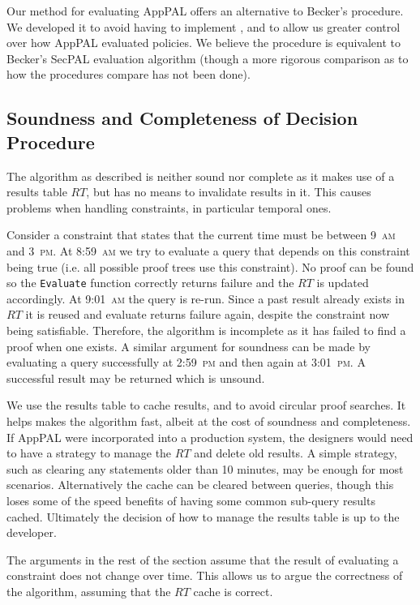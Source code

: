 \documentclass[thesis.tex]{subfiles}
\begin{document}
Our method for evaluating AppPAL offers an alternative to Becker's procedure.
We developed it to avoid having to implement \datalogc{}, and to allow us
greater control over how AppPAL evaluated policies.  We believe the procedure
is equivalent to Becker's SecPAL evaluation algorithm (though a more rigorous
comparison as to how the procedures compare has not been done).

\subsection{Soundness and Completeness of Decision Procedure}

The algorithm as described is neither sound nor complete as it makes
use of a results table $RT$, but has no means to invalidate results in
it. This causes problems when handling constraints, in particular
temporal ones.

Consider a constraint that states that the current time must be between
9~\textsc{am} and 3~\textsc{pm}. At 8:59~\textsc{am} we try to evaluate a query
that depends on this constraint being true (i.e. all possible proof trees use
this constraint). No proof can be found so the \texttt{Evaluate} function
correctly returns failure and the $RT$ is updated accordingly. At
9:01~\textsc{am} the query is re-run. Since a past result already exists in $RT$
it is reused and evaluate returns failure again, despite the constraint now
being satisfiable. Therefore, the algorithm is incomplete as it has failed to
find a proof when one exists. A similar argument for soundness can be made by
evaluating a query successfully at 2:59~\textsc{pm} and then again at
3:01~\textsc{pm}. A successful result may be returned which is unsound.

We use the results table to cache results, and to avoid circular proof searches.
It helps makes the algorithm fast, albeit at the cost of soundness and
completeness. If AppPAL were incorporated into a production system, the
designers would need to have a strategy to manage the $RT$ and delete old
results. A simple strategy, such as clearing any statements older than 10
minutes, may be enough for most scenarios.  Alternatively the cache can be cleared between queries, though this loses some of the speed benefits of having some common sub-query results cached.  Ultimately the decision of how to manage the results table is up to the developer.

The arguments in the rest of the section assume that the result of evaluating a
constraint does not change over time. This allows us to argue the
correctness of the algorithm, assuming that the $RT$ cache is correct.
\end{document}
